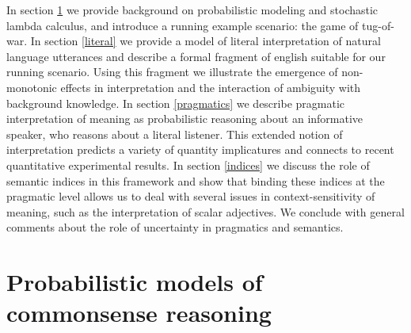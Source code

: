 \documentclass[pdfextras]{handbook}
\begin{document}
In section \ref{commonsense} we provide background on probabilistic modeling and stochastic lambda calculus, and introduce a running example scenario: the game of tug-of-war. In section \ref{literal} we provide a model of literal interpretation of natural language utterances and describe a formal fragment of english suitable for our running scenario. Using this fragment we illustrate the emergence of non-monotonic effects in interpretation and the interaction of ambiguity with background knowledge. In section \ref{pragmatics} we describe pragmatic interpretation of meaning as probabilistic reasoning about an informative speaker, who reasons about a literal listener. This extended notion of interpretation predicts a variety of quantity implicatures and connects to recent quantitative experimental results. In section \ref{indices} we discuss the role of semantic indices in this framework and show that binding these indices at the pragmatic level allows us to deal with several issues in context-sensitivity of meaning, such as the interpretation of scalar adjectives. We conclude with general comments about the role of uncertainty in pragmatics and semantics.



\section{Probabilistic models of commonsense reasoning}
\label{commonsense}


  
  
  
  
\end{document}
